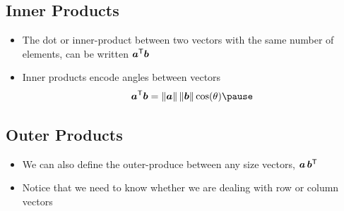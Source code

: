 
\begin{slide}
\section[-1]{Inner Products}

\pb
\begin{itemize}
\item The dot or inner-product between two vectors with the same
  number of elements, can be written $\bm{a}^{\textsf{T}}\bm{b}$\pause
  \begin{center}
    \pause
  \end{center}
\item Inner products encode  angles between vectors
  \begin{align*}
    \bm{a}^\tr\bm{b} = \|\bm{a}\| \, \|\bm{b}\| \cos(\theta)\pause
  \end{align*}
\end{itemize}


\end{slide}


\begin{slide}
\section{Outer Products}

\pb
\begin{itemize}
\item We can also define the outer-produce between any size vectors, $\bm{a}\,\bm{b}^{\textsf{T}}$\pause
  \begin{center}
    \pause
  \end{center}
\item Notice that we need to know whether we are dealing with row or
  column vectors\pause
\end{itemize}
\end{slide}


